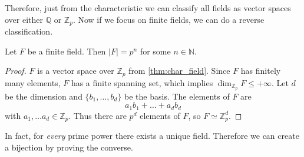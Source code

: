   Therefore, just from the characteristic we can classify all fields as vector spaces over either $\mathbb{Q}$ or $\mathbb{Z}_p$. Now if we focus on finite fields, we can do a reverse classification. 

  \begin{theorem}
    Let $F$ be a finite field. Then $|F| = p^n$ for some $n \in \mathbb{N}$. 
  \end{theorem}
  \begin{proof}
    $F$ is a vector space over $\mathbb{Z}_p$ from \ref{thm:char_field}. Since $F$ has finitely many elements, $F$ has a finite spanning set, which implies $\dim_{\mathbb{Z}_p} F \leq + \infty$. Let $d$ be the dimension and $\{b_1, \ldots, b_d\}$ be the basis. The elements of $F$ are 
    \begin{equation}
      a_1 b_1 + \ldots + a_d b_d
    \end{equation}
    with $a_1, \ldots a_d \in \mathbb{Z}_p$. Thus there are $p^d$ elements of $F$, so $F \simeq \mathbb{Z}_p^d$. 
  \end{proof}

  In fact, for \textit{every} prime power there exists a unique field. Therefore we can create a bijection by proving the converse. 

